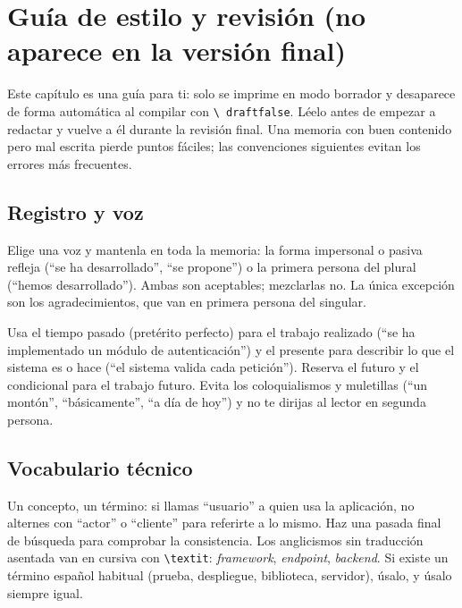 \chapter*{Guía de estilo y revisión (no aparece en la versión final)}

Este capítulo es una guía para ti: solo se imprime en modo borrador y
desaparece de forma automática al compilar con \texttt{\textbackslash
draftfalse}. Léelo antes de empezar a redactar y vuelve a él durante la
revisión final. Una memoria con buen contenido pero mal escrita pierde
puntos fáciles; las convenciones siguientes evitan los errores más
frecuentes.

\section*{Registro y voz}

Elige una voz y mantenla en toda la memoria: la forma impersonal o pasiva
refleja (\enquote{se ha desarrollado}, \enquote{se propone}) o la primera
persona del plural (\enquote{hemos desarrollado}). Ambas son aceptables;
mezclarlas no. La única excepción son los agradecimientos, que van en
primera persona del singular.

Usa el tiempo pasado (pretérito perfecto) para el trabajo realizado
(\enquote{se ha implementado un módulo de autenticación}) y el presente
para describir lo que el sistema es o hace (\enquote{el sistema valida
cada petición}). Reserva el futuro y el condicional para el trabajo
futuro. Evita los coloquialismos y muletillas (\enquote{un montón},
\enquote{básicamente}, \enquote{a día de hoy}) y no te dirijas al lector
en segunda persona.

\section*{Vocabulario técnico}

Un concepto, un término: si llamas \enquote{usuario} a quien usa la
aplicación, no alternes con \enquote{actor} o \enquote{cliente} para
referirte a lo mismo. Haz una pasada final de búsqueda para comprobar la
consistencia. Los anglicismos sin traducción asentada van en cursiva con
\texttt{\textbackslash textit}: \textit{framework}, \textit{endpoint},
\textit{backend}. Si existe un término español habitual (prueba,
despliegue, biblioteca, servidor), úsalo, y úsalo siempre igual.

